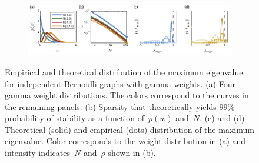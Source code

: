 \begin{figure}[t]
\vspace{-.5em}
\begin{center}
\begin{subfigure}[b]{5.5in}
  \includegraphics[width=\textwidth]{figures/ch3/stability} 
\end{subfigure}
\end{center}
\vspace{-1em}
\caption[Distribution of the maximum eigenvalue for
  i.i.d. random graphs]{Empirical and theoretical distribution of the maximum
  eigenvalue for independent Bernoulli graphs with gamma weights. (a)
  Four gamma weight distributions. The colors correspond to the curves
  in the remaining panels. (b) Sparsity that theoretically yields
  ${99\%}$ probability of stability as a function of~${p(w)}$
  and~$N$. (c) and (d) Theoretical (solid) and empirical (dots)
  distribution of the maximum eigenvalue. Color corresponds to the
  weight distribution in (a) and intensity indicates~$N$ and~$\rho$
  shown in (b).}
\label{fig:stability}
\end{figure}

